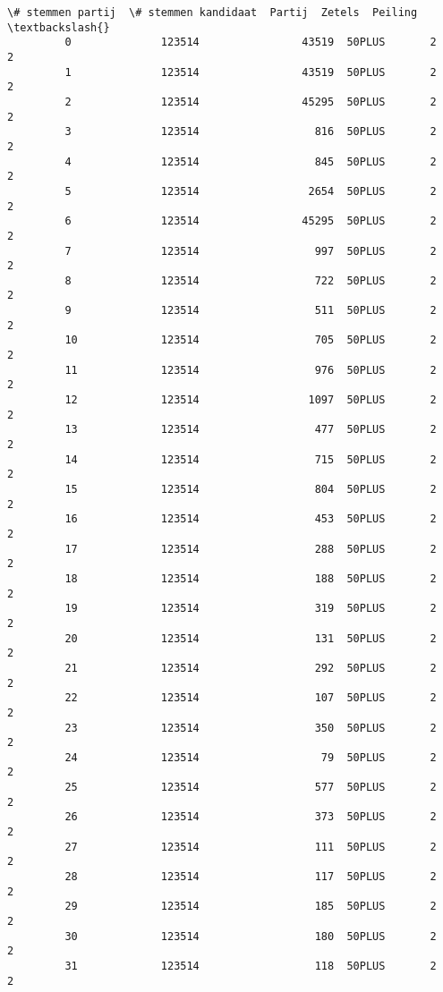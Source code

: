 \documentclass{article}
\begin{document}
\begin{Verbatim}[commandchars=\\\{\}]
              \# stemmen partij  \# stemmen kandidaat  Partij  Zetels  Peiling  \textbackslash{}
         0              123514                43519  50PLUS       2        2   
         1              123514                43519  50PLUS       2        2   
         2              123514                45295  50PLUS       2        2   
         3              123514                  816  50PLUS       2        2   
         4              123514                  845  50PLUS       2        2   
         5              123514                 2654  50PLUS       2        2   
         6              123514                45295  50PLUS       2        2   
         7              123514                  997  50PLUS       2        2   
         8              123514                  722  50PLUS       2        2   
         9              123514                  511  50PLUS       2        2   
         10             123514                  705  50PLUS       2        2   
         11             123514                  976  50PLUS       2        2   
         12             123514                 1097  50PLUS       2        2   
         13             123514                  477  50PLUS       2        2   
         14             123514                  715  50PLUS       2        2   
         15             123514                  804  50PLUS       2        2   
         16             123514                  453  50PLUS       2        2   
         17             123514                  288  50PLUS       2        2   
         18             123514                  188  50PLUS       2        2   
         19             123514                  319  50PLUS       2        2   
         20             123514                  131  50PLUS       2        2   
         21             123514                  292  50PLUS       2        2   
         22             123514                  107  50PLUS       2        2   
         23             123514                  350  50PLUS       2        2   
         24             123514                   79  50PLUS       2        2   
         25             123514                  577  50PLUS       2        2   
         26             123514                  373  50PLUS       2        2   
         27             123514                  111  50PLUS       2        2   
         28             123514                  117  50PLUS       2        2   
         29             123514                  185  50PLUS       2        2   
         30             123514                  180  50PLUS       2        2   
         31             123514                  118  50PLUS       2        2   

\end{Verbatim}
\end{document}
